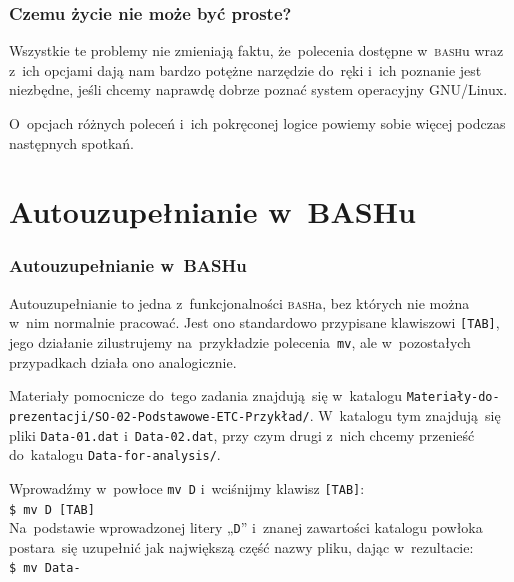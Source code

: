 \documentclass[10pt,t]{beamer}
\begin{document}
\begin{frame}
  \frametitle{Czemu życie nie może być proste?}


  Wszystkie te problemy nie zmieniają faktu, że~polecenia dostępne
  w~\textsc{bash}u wraz z~ich opcjami dają nam bardzo potężne narzędzie
  do~ręki i~ich poznanie jest niezbędne, jeśli chcemy naprawdę dobrze
  poznać system operacyjny GNU/Linux.

  O~opcjach różnych poleceń i~ich pokręconej logice powiemy sobie więcej
  podczas następnych spotkań.

\end{frame}










\section{Autouzupełnianie w~BASHu}


\begin{frame}
  \frametitle{Autouzupełnianie w~BASHu}


  Autouzupełnianie to jedna z~funkcjonalności \textsc{bash}a, bez których
  nie można w~nim normalnie pracować. Jest ono standardowo przypisane
  klawiszowi \texttt{[TAB]}, jego działanie zilustrujemy na~przykładzie
  polecenia~\texttt{mv}, ale w~pozostałych przypadkach działa ono
  analogicznie.

  Materiały pomocnicze do~tego zadania znajdują~się w~katalogu
  \texttt{Materiały-do-prezentacji/SO-02-Podstawowe-ETC-Przykład/}.
  W~katalogu tym znajdują~się pliki \texttt{Data-01.dat}
  i~\texttt{Data-02.dat}, przy czym drugi z~nich chcemy przenieść
  do~katalogu \texttt{Data-for-analysis/}.

  Wprowadźmy w~powłoce \texttt{mv D} i~wciśnijmy klawisz \texttt{[TAB]}: \\
  \texttt{\$ mv D [TAB]} \\
  Na~podstawie wprowadzonej litery „\texttt{D}” i~znanej zawartości
  katalogu powłoka postara~się uzupełnić jak największą część nazwy pliku,
  dając w~rezultacie: \\
  \texttt{\$ mv Data-}

\end{frame}
\end{document}
